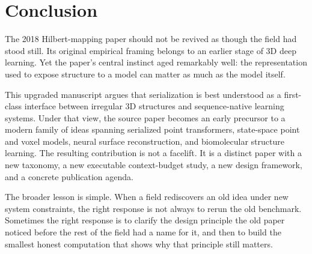 \section{Conclusion}

The 2018 Hilbert-mapping paper should not be revived as though the field had stood still. Its original empirical framing belongs to an earlier stage of 3D deep learning. Yet the paper's central instinct aged remarkably well: the representation used to expose structure to a model can matter as much as the model itself.

This upgraded manuscript argues that serialization is best understood as a first-class interface between irregular 3D structures and sequence-native learning systems. Under that view, the source paper becomes an early precursor to a modern family of ideas spanning serialized point transformers, state-space point and voxel models, neural surface reconstruction, and biomolecular structure learning. The resulting contribution is not a facelift. It is a distinct paper with a new taxonomy, a new executable context-budget study, a new design framework, and a concrete publication agenda.

The broader lesson is simple. When a field rediscovers an old idea under new system constraints, the right response is not always to rerun the old benchmark. Sometimes the right response is to clarify the design principle the old paper noticed before the rest of the field had a name for it, and then to build the smallest honest computation that shows why that principle still matters.
